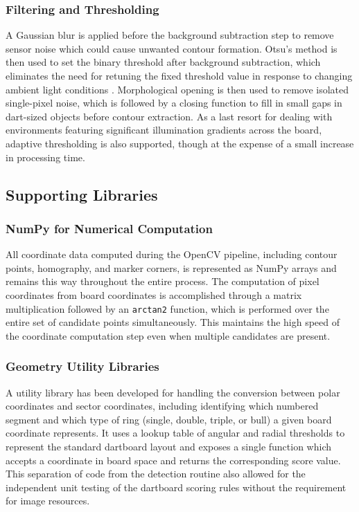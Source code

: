 \subsubsection{Filtering and Thresholding}
A Gaussian blur is applied before the background subtraction step to remove sensor noise which could cause unwanted contour formation. Otsu's method is then used to set the binary threshold after background subtraction, which eliminates the need for retuning the fixed threshold value in response to changing ambient light conditions \cite{Otsu1979}. Morphological opening is then used to remove isolated single-pixel noise, which is followed by a closing function to fill in small gaps in dart-sized objects before contour extraction. As a last resort for dealing with environments featuring significant illumination gradients across the board, adaptive thresholding is also supported, though at the expense of a small increase in processing time.

\subsection{Supporting Libraries}

\subsubsection{NumPy for Numerical Computation}
All coordinate data computed during the OpenCV pipeline, including contour points, homography, and marker corners, is represented as NumPy arrays and remains this way throughout the entire process. The computation of pixel coordinates from board coordinates is accomplished through a matrix multiplication followed by an \texttt{arctan2} function, which is performed over the entire set of candidate points simultaneously. This maintains the high speed of the coordinate computation step even when multiple candidates are present.

\subsubsection{Geometry Utility Libraries}
A utility library has been developed for handling the conversion between polar coordinates and sector coordinates, including identifying which numbered segment and which type of ring (single, double, triple, or bull) a given board coordinate represents. It uses a lookup table of angular and radial thresholds to represent the standard dartboard layout and exposes a single function which accepts a coordinate in board space and returns the corresponding score value. This separation of code from the detection routine also allowed for the independent unit testing of the dartboard scoring rules without the requirement for image resources.

